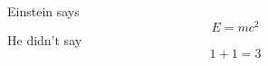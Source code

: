Einstein says
\begin{equation}
E = mc^2 \label{clever}
\end{equation}
He didn’t say
\begin{equation}
1 + 1 = 3 \tag{dumb}
\end{equation}